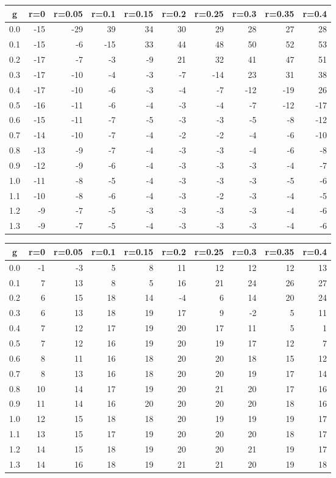 %
\begin{table}[!tbp]
 \begin{center}
 \begin{tabular}{rrrrrrrrrr}\hline\hline
\multicolumn{1}{c}{g}&\multicolumn{1}{c}{r=0}&\multicolumn{1}{c}{r=0.05}&\multicolumn{1}{c}{r=0.1}&\multicolumn{1}{c}{r=0.15}&\multicolumn{1}{c}{r=0.2}&\multicolumn{1}{c}{r=0.25}&\multicolumn{1}{c}{r=0.3}&\multicolumn{1}{c}{r=0.35}&\multicolumn{1}{c}{r=0.4}\tabularnewline
\hline
0.0&-15&-29& 39&34&30& 29& 28& 27& 28\tabularnewline
0.1&-15& -6&-15&33&44& 48& 50& 52& 53\tabularnewline
0.2&-17& -7& -3&-9&21& 32& 41& 47& 51\tabularnewline
0.3&-17&-10& -4&-3&-7&-14& 23& 31& 38\tabularnewline
0.4&-17&-10& -6&-3&-4& -7&-12&-19& 26\tabularnewline
0.5&-16&-11& -6&-4&-3& -4& -7&-12&-17\tabularnewline
0.6&-15&-11& -7&-5&-3& -3& -5& -8&-12\tabularnewline
0.7&-14&-10& -7&-4&-2& -2& -4& -6&-10\tabularnewline
0.8&-13& -9& -7&-4&-3& -3& -4& -6& -8\tabularnewline
0.9&-12& -9& -6&-4&-3& -3& -3& -4& -7\tabularnewline
1.0&-11& -8& -5&-4&-3& -3& -3& -5& -6\tabularnewline
1.1&-10& -8& -6&-4&-3& -2& -3& -4& -5\tabularnewline
1.2& -9& -7& -5&-3&-3& -3& -3& -4& -6\tabularnewline
1.3& -9& -7& -5&-4&-3& -3& -3& -4& -6\tabularnewline
\hline
\end{tabular}

\end{center}

\end{table}

%
\begin{table}[!tbp]
 \begin{center}
 \begin{tabular}{rrrrrrrrrr}\hline\hline
\multicolumn{1}{c}{g}&\multicolumn{1}{c}{r=0}&\multicolumn{1}{c}{r=0.05}&\multicolumn{1}{c}{r=0.1}&\multicolumn{1}{c}{r=0.15}&\multicolumn{1}{c}{r=0.2}&\multicolumn{1}{c}{r=0.25}&\multicolumn{1}{c}{r=0.3}&\multicolumn{1}{c}{r=0.35}&\multicolumn{1}{c}{r=0.4}\tabularnewline
\hline
0.0&-1&-3& 5& 8&11&12&12&12&13\tabularnewline
0.1& 7&13& 8& 5&16&21&24&26&27\tabularnewline
0.2& 6&15&18&14&-4& 6&14&20&24\tabularnewline
0.3& 6&13&18&19&17& 9&-2& 5&11\tabularnewline
0.4& 7&12&17&19&20&17&11& 5& 1\tabularnewline
0.5& 7&12&16&19&20&19&17&12& 7\tabularnewline
0.6& 8&11&16&18&20&20&18&15&12\tabularnewline
0.7& 8&13&16&18&20&20&19&17&14\tabularnewline
0.8&10&14&17&19&20&21&20&17&16\tabularnewline
0.9&11&14&16&20&20&20&20&18&16\tabularnewline
1.0&12&15&18&18&20&19&19&19&17\tabularnewline
1.1&13&15&17&19&20&20&20&18&17\tabularnewline
1.2&14&15&18&19&20&20&21&19&17\tabularnewline
1.3&14&16&18&19&21&21&20&19&18\tabularnewline
\hline
\end{tabular}

\end{center}

\end{table}

